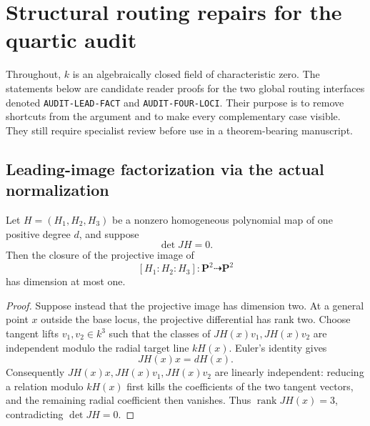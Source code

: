 
\section{Structural routing repairs for the quartic audit}

Throughout, \(k\) is an algebraically closed field of characteristic zero.
The statements below are candidate reader proofs for the two global routing
interfaces denoted \texttt{AUDIT-LEAD-FACT} and
\texttt{AUDIT-FOUR-LOCI}.  Their purpose is to remove shortcuts from the
argument and to make every complementary case visible.  They still require
specialist review before use in a theorem-bearing manuscript.

\subsection{Leading-image factorization via the actual normalization}

\begin{lemma}
\label{lem:lane4-leading-image-dimension}
Let \(H=(H_1,H_2,H_3)\) be a nonzero homogeneous polynomial map of one
positive degree \(d\), and suppose
\[
 \det JH=0.
\]
Then the closure of the projective image of
\[
 [H_1:H_2:H_3]\colon\mathbf P^2\dashrightarrow\mathbf P^2
\]
has dimension at most one.
\end{lemma}

\begin{proof}
Suppose instead that the projective image has dimension two.  At a general
point \(x\) outside the base locus, the projective differential has rank two.
Choose tangent lifts \(v_1,v_2\in k^3\) such that the classes of
\(JH(x)v_1,JH(x)v_2\) are independent modulo the radial target line
\(kH(x)\).  Euler's identity gives
\[
 JH(x)x=dH(x).
\]
Consequently \(JH(x)x,JH(x)v_1,JH(x)v_2\) are linearly independent: reducing
a relation modulo \(kH(x)\) first kills the coefficients of the two tangent
vectors, and the remaining radial coefficient then vanishes.  Thus
\(\operatorname{rank}JH(x)=3\), contradicting \(\det JH=0\).
\end{proof}

